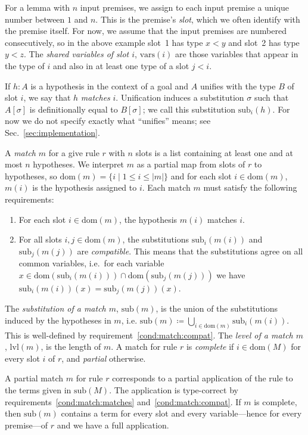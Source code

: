 \documentclass[runningheads]{llncs}
\newcommand{\vars}{\ensuremath{\mathrm{vars}}}
\newcommand{\dom}{\ensuremath{\mathrm{dom}}}
\newcommand{\sub}{\ensuremath{\mathrm{sub}}}
\newcommand{\lvl}{\ensuremath{\mathrm{lvl}}}
\begin{document}
For a lemma with $n$ input premises, we assign to each input premise a unique number between $1$ and $n$.
This is the premise's \emph{slot}, which we often identify with the premise itself.
For now, we assume that the input premises are numbered consecutively, so in the above example slot~1 has type $x < y$ and slot~2 has type $y < z$.
The \emph{shared variables of slot $i$}, $\vars(i)$ are those variables that appear in the type of $i$ and also in at least one type of a slot $j < i$.

If $h : A$ is a hypothesis in the context of a goal and $A$ unifies with the type $B$ of slot $i$, we say that $h$ \emph{matches} $i$.
Unification induces a substitution $σ$ such that $A[σ]$ is definitionally equal to $B[σ]$; we call this substitution $\sub_{i}(h)$.
For now we do not specify exactly what \enquote{unifies} means; see Sec.~\ref{sec:implementation}.

A \textit{match} $m$ for a give rule $r$ with $n$ slots is a list containing at least one and at most $n$ hypotheses.
We interpret $m$ as a partial map from slots of $r$ to hypotheses, so $\dom(m) = \{i \mid 1 ≤ i ≤ |m| \}$ and for each slot $i ∈ \dom(m)$, $m(i)$ is the hypothesis assigned to $i$.
Each match $m$ must satisfy the following requirements:
\begin{enumerate}
  \item\label{cond:match:matches} For each slot $i ∈ \dom(m)$, the hypothesis $m(i)$ matches $i$.
  \item\label{cond:match:compat} For all slots $i,j ∈ \dom(m)$, the substitutions $\sub_{i}(m(i))$ and $\sub_{j}(m(j))$ are \emph{compatible}.
        This means that the substitutions agree on all common variables, i.e.\ for each variable $x ∈ \dom(\sub_{i}(m(i))) ∩ \dom(\sub_{j}(m(j)))$ we have $\sub_{i}(m(i))(x) = \sub_{j}(m(j))(x)$.
\end{enumerate}
The \emph{substitution of a match $m$}, $\sub(m)$, is the union of the substitutions induced by the hypotheses in $m$, i.e. $\sub(m) ≔ ⋃_{i ∈ \dom(m)}\sub_{i}(m(i))$.
This is well-defined by requirement~\ref{cond:match:compat}.
The \textit{level of a match $m$}, $\lvl(m)$, is the length of $m$.
A match for rule $r$ is \textit{complete} if $i ∈ \dom(M)$ for every slot $i$ of $r$, and \emph{partial} otherwise.

A partial match $m$ for rule $r$ corresponds to a partial application of the rule to the terms given in $\sub(M)$.
The application is type-correct by requirements~\ref{cond:match:matches} and~\ref{cond:match:compat}.
If $m$ is complete, then $\sub(m)$ contains a term for every slot and every variable---hence for every premise---of $r$ and we have a full application.
\end{document}
